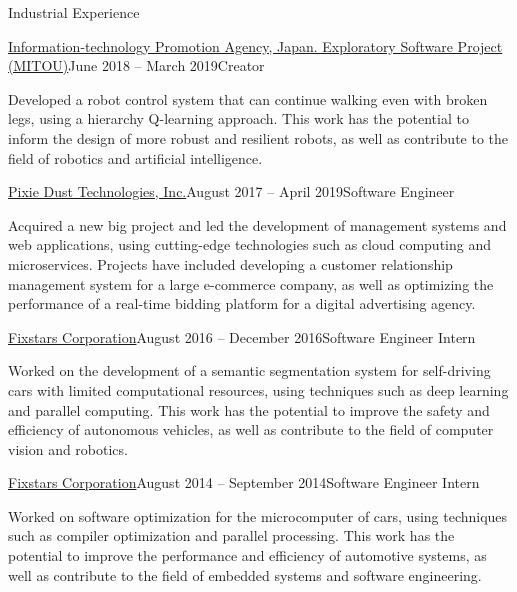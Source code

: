 \documentclass{resume} %
\begin{document}
\begin{rSection}{Industrial Experience}
    \begin{rSubsection}{\href{https://www.mitou.org/}{Information-technology Promotion Agency, Japan. Exploratory Software Project (MITOU)}}{June 2018 -- March 2019}{Creator}{}
    \item Developed a robot control system that can continue walking even with broken legs, using a hierarchy Q-learning approach. This work has the potential to inform the design of more robust and resilient robots, as well as contribute to the field of robotics and artificial intelligence.
    \end{rSubsection}

    \begin{rSubsection}{\href{http://pixiedusttech.com/}{Pixie Dust Technologies, Inc.}}{August 2017 -- April 2019}{Software Engineer}{}
    \item Acquired a new big project and led the development of management systems and web applications, using cutting-edge technologies such as cloud computing and microservices. Projects have included developing a customer relationship management system for a large e-commerce company, as well as optimizing the performance of a real-time bidding platform for a digital advertising agency.
    \end{rSubsection}

    \begin{rSubsection}{\href{https://www.fixstars.com/en/}{Fixstars Corporation}}{August 2016 -- December 2016}{Software Engineer Intern}{}
    \item Worked on the development of a semantic segmentation system for self-driving cars with limited computational resources, using techniques such as deep learning and parallel computing. This work has the potential to improve the safety and efficiency of autonomous vehicles, as well as contribute to the field of computer vision and robotics.
    \end{rSubsection}

    \begin{rSubsection}{\href{https://www.fixstars.com/en/}{Fixstars Corporation}}{August 2014 -- September 2014}{Software Engineer Intern}{}
    \item Worked on software optimization for the microcomputer of cars, using techniques such as compiler optimization and parallel processing. This work has the potential to improve the performance and efficiency of automotive systems, as well as contribute to the field of embedded systems and software engineering.
    \end{rSubsection}

\end{rSection}
\end{document}
